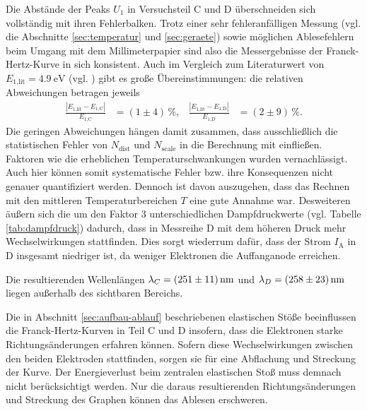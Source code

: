 \noindent
Die Abstände der Peaks $U_1$ in Versuchsteil C und D überschneiden sich vollständig mit ihren Fehlerbalken.
Trotz einer sehr fehleranfälligen Messung (vgl. die Abschnitte \ref{sec:temperatur} und \ref{sec:geraete}) sowie 
möglichen Ablesefehlern beim Umgang mit dem Millimeterpapier sind also die Messergebnisse der Franck-Hertz-Kurve in sich konsistent.
Auch im Vergleich zum Literaturwert von $E_\text{1,lit} = \qty[]{4.9}{\electronvolt}$ (vgl. \cite[]{energieniveaus}) gibt es große Übereinstimmungen:
die relativen Abweichungen betragen jeweils
\begin{align*}
    \frac{|E_\text{1,lit} - E_\text{1,C}|}{E_\text{1,C}} &= (\num[]{1} \pm \num[]{4}) \, \%, &
    \frac{|E_\text{1,lit} - E_\text{1,D}|}{E_\text{1,D}} &= (\num[]{2} \pm \num[]{9}) \, \%.
\end{align*}
Die geringen Abweichungen hängen damit zusammen, dass ausschließlich die statistischen Fehler von $N_\text{dist}$ und $N_\text{scale}$ in die Berechnung mit einfließen.
Faktoren wie die erheblichen Temperaturschwankungen wurden vernachlässigt.
Auch hier können somit systematische Fehler bzw. ihre Konsequenzen nicht genauer quantifiziert werden.
Dennoch ist davon auszugehen, dass das Rechnen mit den mittleren Temperaturbereichen $T$ eine gute Annahme war.
Desweiteren äußern sich die um den Faktor 3 unterschiedlichen Dampfdruckwerte (vgl. Tabelle \ref{tab:dampfdruck}) dadurch,
dass in Messreihe D mit dem höheren Druck mehr Wechselwirkungen stattfinden.
Dies sorgt wiederrum dafür, dass der Strom $I_\text{A}$ in D insgesamt niedriger ist, da weniger Elektronen die Auffanganode erreichen.

\noindent
Die resultierenden Wellenlängen $\lambda_C = \qty{ 251 +- 011 }{\nano\m}$ und $\lambda_D= \qty{258 +- 023}{\nano\m}$ liegen außerhalb des sichtbaren Bereichs.

\noindent
Die in Abschnitt \ref{sec:aufbau-ablauf} beschriebenen elastischen Stöße beeinflussen die Franck-Hertz-Kurven in Teil C und D insofern, 
dass die Elektronen starke Richtungsänderungen erfahren können.
Sofern diese Wechselwirkungen zwischen den beiden Elektroden stattfinden, sorgen sie für eine Abflachung und Streckung der Kurve.
Der Energieverlust beim zentralen elastischen Stoß muss demnach nicht berücksichtigt werden. 
Nur die daraus resultierenden Richtungsänderungen und Streckung des Graphen können das Ablesen erschweren.







